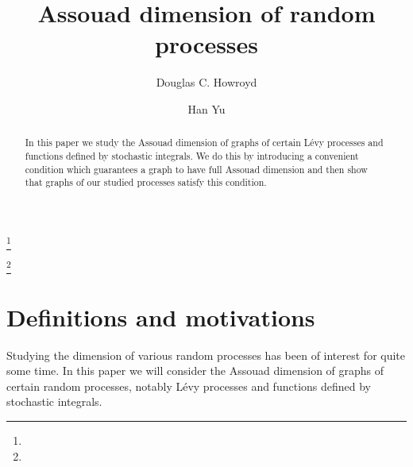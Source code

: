 \documentclass{amsart}
\begin{document}
\title{Assouad dimension of random processes}

\author{Douglas C. Howroyd}
\address{Douglas C. Howroyd\\
	School of Mathematics \& Statistics\\University of St Andrews\\ St Andrews\\ KY16 9SS\\ UK \\ }
\curraddr{}
\thanks{}

\author{Han Yu}
\address{Han Yu\\
School of Mathematics \& Statistics\\University of St Andrews\\ St Andrews\\ KY16 9SS\\ UK \\ }
\curraddr{}
\thanks{}





\date{}


\begin{abstract}
In this paper we study the Assouad dimension of graphs of certain L\'evy processes and functions defined by stochastic integrals. We do this by introducing a convenient condition which guarantees a graph to have full Assouad dimension and then show that graphs of our studied processes satisfy this condition. 
\end{abstract}

\maketitle

\section{Definitions and motivations}\label{LINK}

Studying the dimension of various random processes has been of interest for quite some time. In this paper we will consider the Assouad dimension of graphs of certain random processes, notably L\'evy processes and functions defined by stochastic integrals. 
\end{document}
